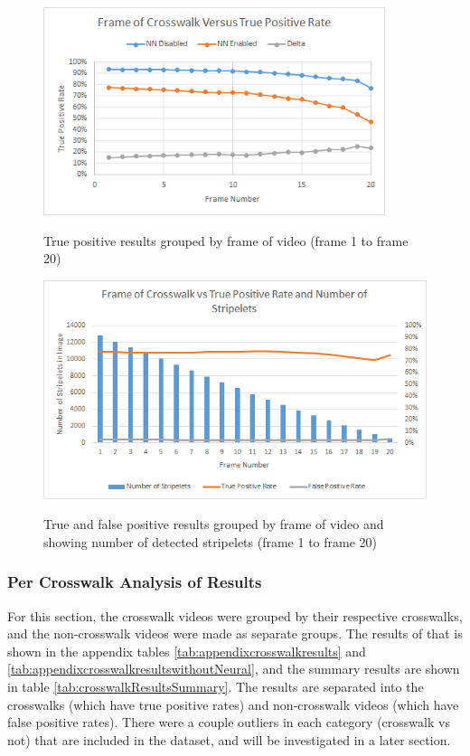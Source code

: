 \documentclass[12pt]{ucthesis}
\newcommand{\captionfonts}{\small\bf\ssp}
\begin{document}
\begin{figure}[t]
\begin{center}
\includegraphics[width=10cm]{FrameResultsGraph.png}
\captionfonts
\caption[Neural Network True Positives Grouped by Frame of Video]{True positive results grouped by frame of video (frame 1 to frame 20)}
\label{fig:graphOfFrameCount}
\end{center}
\end{figure}

\begin{figure}[t]
\begin{center}
\includegraphics[width=12cm]{NumStripeletsvsRates.png}
\captionfonts
\caption[True and False Positives Grouped by Frame of Video and Number of Stripelets]{True and false positive results grouped by frame of video and showing number of detected stripelets (frame 1 to frame 20)}
\label{fig:NumStripeletsvsRates}
\end{center}
\end{figure}

\subsubsection{Per Crosswalk Analysis of Results}

For this section, the crosswalk videos were grouped by their respective crosswalks, and the non-crosswalk videos were made as separate groups. The results of that is shown in the appendix tables \ref{tab:appendixcrosswalkresults} and \ref{tab:appendixcrosswalkresultswithoutNeural}, and the summary results are shown in table \ref{tab:crosswalkResultsSummary}. The results are separated into the crosswalks (which have true positive rates) and non-crosswalk videos (which have false positive rates).  There were a couple outliers in each category (crosswalk vs not) that are included in the dataset, and will be investigated in a later section.
\end{document}
